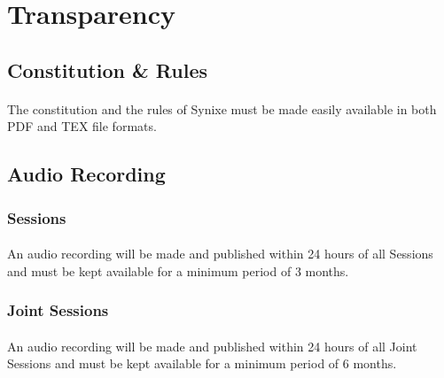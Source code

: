 \documentclass[10pt,a4paper]{article}
\begin{document}
\section{Transparency}
\subsection{Constitution \& Rules}
\paragraph{}
The constitution and the rules of Synixe must be made easily available in both PDF and TEX file formats.
\subsection{Audio Recording}
\subsubsection{Sessions}
\paragraph{}
An audio recording will be made and published within 24 hours of all Sessions and must be kept available for a minimum period of 3 months.
\subsubsection{Joint Sessions}
\paragraph{}
An audio recording will be made and published within 24 hours of all Joint Sessions and must be kept available for a minimum period of 6 months.
\end{document}
